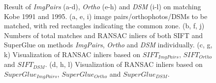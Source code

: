 \begin{figure}[htbp]
\begin{center}
        \caption{{\scriptsize Result of \textit{ImgPairs} (a-d), \textit{Ortho} (e-h) and \textit{DSM} (i-l) on matching Kobe 1991 and 1995. (a, e, i) image pairs/orthophotos/DSMs to be matched, with red rectangles indicating the common zone. (b, f, j) Numbers of total matches and RANSAC inliers of both SIFT and SuperGlue on methods \textit{ImgPairs}, \textit{Ortho} and \textit{DSM} individually. (c, g, k) Visualization of RANSAC inliers based on $SIFT_{ImgPairs}$, $SIFT_{Ortho}$ and $SIFT_{DSM}$. (d, h, l) Visualization of RANSAC inliers based on $SuperGlue_{ImgPairs}$, $SuperGlue_{Ortho}$ and $SuperGlue_{DSM}$.}}        
        \label{MatchVizKobe1991DSM}
    \end{center}
\end{figure} 






